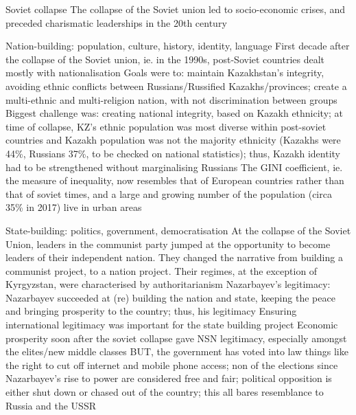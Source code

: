 \documentclass{article}
\begin{document}
\begin{outline}
	\1 Soviet collapse
		\2 The collapse of the Soviet union led to socio-economic crises, and preceded charismatic leaderships in the 20th century\cite{isaacs2010papa}
		
	\1 Nation-building: population, culture, history, identity, language
		\2 First decade after the collapse of the Soviet union, ie. in the 1990s, post-Soviet countries dealt mostly with nationalisation
		\2 Goals were to: maintain Kazakhstan's integrity, avoiding ethnic conflicts between Russians/Russified Kazakhs/provinces; create a multi-ethnic and multi-religion nation, with not discrimination between groups
		\2 Biggest challenge was: creating national integrity, based on Kazakh ethnicity; at time of collapse, KZ's ethnic population was most diverse within post-soviet countries and Kazakh population was not the majority ethnicity (Kazakhs were 44\%, Russians 37\%, to be checked on national statistics); thus, Kazakh identity had to be strengthened without marginalising Russians 
		\2 The GINI coefficient, ie. the measure of inequality, now resembles that of European countries rather than that of soviet times, and a large and growing number of the population (circa 35\% in 2017) live in urban areas

	\1 State-building: politics, government, democratisation
		\2	At the collapse of the Soviet Union, leaders in the communist party jumped at the opportunity to become leaders of their independent nation. They changed the narrative from building a communist project, to a nation project. Their regimes, at the exception of Kyrgyzstan, were  characterised by authoritarianism\cite{batsaikhan2017central}
		\2 Nazarbayev's legitimacy:
			\3 Nazarbayev succeeded at (re) building the nation and state, keeping the peace and bringing prosperity to the country; thus, his legitimacy 
			\3 Ensuring international legitimacy was important for the state building project
			\3 Economic prosperity soon after the soviet collapse gave NSN legitimacy, especially amongst the elites/new middle classes
		\2 BUT, the government has voted into law things like the right to cut off internet and mobile phone access; non of the elections since Nazarbayev's rise to power are considered free and fair; political opposition is either shut down or chased out of the country; this all bares resemblance to Russia and the USSR
			

\end{outline}
\end{document}
